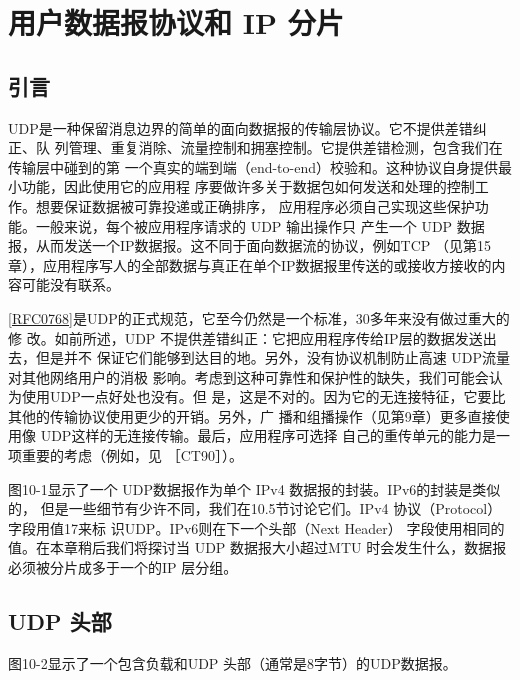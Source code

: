 \chapter{用户数据报协议和 IP 分片}
\minitoc

\section{引言}
UDP是一种保留消息边界的简单的面向数据报的传输层协议。它不提供差错纠正、队
列管理、重复消除、流量控制和拥塞控制。它提供差错检测，包含我们在传输层中碰到的第
一个真实的端到端（end-to-end）校验和。这种协议自身提供最小功能，因此使用它的应用程
序要做许多关于数据包如何发送和处理的控制工作。想要保证数据被可靠投递或正确排序，
应用程序必须自己实现这些保护功能。一般来说，每个被应用程序请求的 UDP 输出操作只
产生一个 UDP 数据报，从而发送一个IP数据报。这不同于面向数据流的协议，例如TCP
（见第15章），应用程序写人的全部数据与真正在单个IP数据报里传送的或接收方接收的内
容可能没有联系。

\href{https://www.rfc-editor.org/rfc/rfc0768}{[RFC0768]}是UDP的正式规范，它至今仍然是一个标准，30多年来没有做过重大的修
改。如前所述，UDP 不提供差错纠正：它把应用程序传给IP层的数据发送出去，但是并不
保证它们能够到达目的地。另外，没有协议机制防止高速 UDP流量对其他网络用户的消极
影响。考虑到这种可靠性和保护性的缺失，我们可能会认为使用UDP一点好处也没有。但
是，这是不对的。因为它的无连接特征，它要比其他的传输协议使用更少的开销。另外，广
播和组播操作（见第9章）更多直接使用像 UDP这样的无连接传输。最后，应用程序可选择
自己的重传单元的能力是一项重要的考虑（例如，见 ［CT90］）。

图10-1显示了一个 UDP数据报作为单个 IPv4 数据报的封装。IPv6的封装是类似的，
但是一些细节有少许不同，我们在10.5节讨论它们。IPv4 协议（Protocol）字段用值17来标
识UDP。IPv6则在下一个头部（Next Header） 字段使用相同的值。在本章稍后我们将探讨当
UDP 数据报大小超过MTU 时会发生什么，数据报必须被分片成多于一个的IP 层分组。

\section{UDP 头部}

图10-2显示了一个包含负载和UDP 头部（通常是8字节）的UDP数据报。

